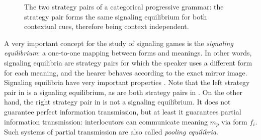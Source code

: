 \documentclass[output=paper,hidelinks]{langscibook}
\begin{document}
\begin{figure}[t]
\centering
\begin{minipage}{51mm}	
\centering  
{}
\end{minipage}
\begin{minipage}{51mm}	
\centering    
{}
\end{minipage}

\caption{The two strategy pairs of a categorical progressive grammar: the strategy pair forms the same signaling equilibrium for both contextual cues, therefore being context independent.}
\label{fig:s10h5-sigsys}
\end{figure}

A very important concept for the study of signaling games is the \emph{signaling equilibrium}: 
a one-to-one mapping between forms and meanings. In other words, signaling equilibria are strategy pairs for which the speaker uses a different form for each meaning, and the hearer behaves according to the exact mirror image. Signaling equilibria have very important properties
\citep[cf.][]{jaeger08stability}. Note that the left strategy pair in  is a signaling equilibrium, as are both strategy pairs in . On the other hand, the right strategy pair in  is not a signaling equilibrium. It does not guarantee perfect information transmission, but at least it guarantees partial information transmission: interlocutors can  communicate meaning $m_p$ via form $f_{i}$. Such systems of partial transmission are also called \emph{pooling equilibria}.
\end{document}
